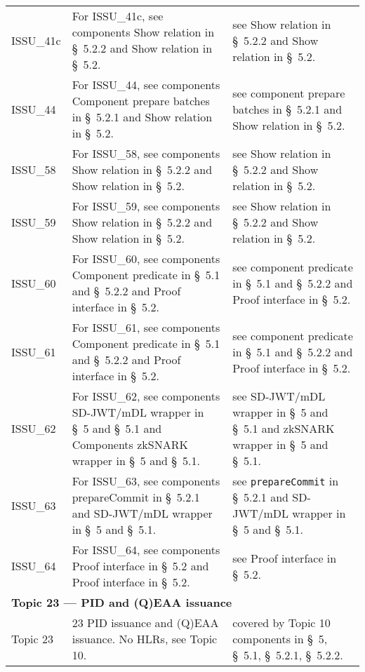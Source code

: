 \begin{landscape}
\begin{longtable}{p{3cm} p{10cm} p{7cm}}
ISSU\_41c &
For ISSU\_41c, see components Show relation in \S~5.2.2 and Show relation in \S~5.2. &
see Show relation in \S~5.2.2 and Show relation in \S~5.2. \\

ISSU\_44 &
For ISSU\_44, see components Component prepare batches in \S~5.2.1 and Show relation in \S~5.2. &
see component prepare batches in \S~5.2.1 and Show relation in \S~5.2. \\

ISSU\_58 &
For ISSU\_58, see components Show relation in \S~5.2.2 and Show relation in \S~5.2. &
see Show relation in \S~5.2.2 and Show relation in \S~5.2. \\

ISSU\_59 &
For ISSU\_59, see components Show relation in \S~5.2.2 and Show relation in \S~5.2. &
see Show relation in \S~5.2.2 and Show relation in \S~5.2. \\

ISSU\_60 &
For ISSU\_60, see components Component predicate in \S~5.1 and \S~5.2.2 and Proof interface in \S~5.2. &
see component predicate in \S~5.1 and \S~5.2.2 and Proof interface in \S~5.2. \\

ISSU\_61 &
For ISSU\_61, see components Component predicate in \S~5.1 and \S~5.2.2 and Proof interface in \S~5.2. &
see component predicate in \S~5.1 and \S~5.2.2 and Proof interface in \S~5.2. \\

ISSU\_62 &
For ISSU\_62, see components SD-JWT/mDL wrapper in \S~5 and \S~5.1 and Components zkSNARK wrapper in \S~5 and \S~5.1. &
see SD-JWT/mDL wrapper in \S~5 and \S~5.1 and zkSNARK wrapper in \S~5 and \S~5.1. \\

ISSU\_63 &
For ISSU\_63, see components prepareCommit in \S~5.2.1 and SD-JWT/mDL wrapper in \S~5 and \S~5.1. &
see \texttt{prepareCommit} in \S~5.2.1 and SD-JWT/mDL wrapper in \S~5 and \S~5.1. \\

ISSU\_64 &
For ISSU\_64, see components Proof interface in \S~5.2 and Proof interface in \S~5.2. &
see Proof interface in \S~5.2. \\[1em]

\multicolumn{3}{l}{\textbf{Topic 23 — PID and (Q)EAA issuance}}\\

Topic 23 &
23 PID issuance and (Q)EAA issuance. No HLRs, see Topic 10. &
covered by Topic 10 components in \S~5, \S~5.1, \S~5.2.1, \S~5.2.2. \\[1em]


\end{longtable}
\end{landscape}
